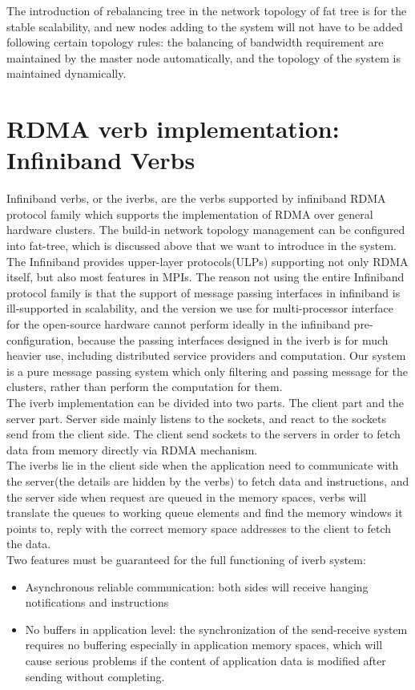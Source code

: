 \documentclass[11pt,openright,a4paper]{report}
\begin{document}
The introduction of rebalancing tree in the network topology of fat tree is for the stable scalability, and new nodes adding to the system will not have to be added following certain topology rules: the balancing of bandwidth requirement are maintained by the master node automatically, and the topology of the system is maintained dynamically.\\
\section{RDMA verb implementation: Infiniband Verbs}
Infiniband verbs, or the iverbs, are the verbs supported by infiniband RDMA protocol family which supports the implementation of RDMA over general hardware clusters\cite{mitchell2013using}. The build-in network topology management can be configured into fat-tree, which is discussed above that we want to introduce in the system. \\
The Infiniband provides upper-layer protocols(ULPs) supporting not only RDMA itself, but also most features in MPIs\cite{liu2003performance}. The reason not using the entire Infiniband protocol family is that the support of message passing interfaces in infiniband is ill-supported in scalability, and the version we use for multi-processor interface for the open-source hardware cannot perform ideally in the infiniband pre-configuration, because the passing interfaces designed in the iverb is for much heavier use, including distributed service providers and computation. Our system is a pure message passing system which only filtering and passing message for the clusters, rather than perform the computation for them.\\
The iverb implementation can be divided into two parts\cite{bedeir2010building}. The client part and the server part. Server side mainly listens to the sockets, and react to the sockets send from the client side. The client send sockets to the servers in order to fetch data from memory directly via RDMA mechanism\cite{jiang2004efficient}.\\ 
The iverbs lie in the client side when the application need to communicate with the server(the details are hidden by the verbs) to fetch data and instructions, and the server side when request are queued in the memory spaces, verbs will translate the queues to working queue elements and find the memory windows it points to, reply with the correct memory space addresses to the client to fetch the data\cite{santhanaraman2008designing}.\\
Two features must be guaranteed for the full functioning of iverb system:
\begin{itemize}
	\item Asynchronous reliable communication: both sides will receive hanging notifications and instructions 
    \item No buffers in application level: the synchronization of the send-receive system requires no buffering especially in application memory spaces, which will cause serious problems if the content of application data is modified after sending without completing.
\end{itemize}
\end{document}
